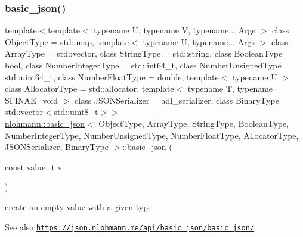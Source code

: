 \subsubsection{\texorpdfstring{basic\+\_\+json()}{basic\_json()}\hspace{0.1cm}{\footnotesize\ttfamily [1/9]}}
{\footnotesize\ttfamily template$<$template$<$ typename U, typename V, typename... Args $>$ class Object\+Type = std\+::map, template$<$ typename U, typename... Args $>$ class Array\+Type = std\+::vector, class String\+Type  = std\+::string, class Boolean\+Type  = bool, class Number\+Integer\+Type  = std\+::int64\+\_\+t, class Number\+Unsigned\+Type  = std\+::uint64\+\_\+t, class Number\+Float\+Type  = double, template$<$ typename U $>$ class Allocator\+Type = std\+::allocator, template$<$ typename T, typename S\+F\+I\+N\+A\+E=void $>$ class J\+S\+O\+N\+Serializer = adl\+\_\+serializer, class Binary\+Type  = std\+::vector$<$std\+::uint8\+\_\+t$>$$>$ \\
\hyperlink{classnlohmann_1_1basic__json}{nlohmann\+::basic\+\_\+json}$<$ Object\+Type, Array\+Type, String\+Type, Boolean\+Type, Number\+Integer\+Type, Number\+Unsigned\+Type, Number\+Float\+Type, Allocator\+Type, J\+S\+O\+N\+Serializer, Binary\+Type $>$\+::\hyperlink{classnlohmann_1_1basic__json}{basic\+\_\+json} (\begin{DoxyParamCaption}\item[{const \hyperlink{namespacenlohmann_1_1detail_a1ed8fc6239da25abcaf681d30ace4985}{value\+\_\+t}}]{v }\end{DoxyParamCaption})\hspace{0.3cm}{\ttfamily [inline]}}



create an empty value with a given type 

\begin{DoxySeeAlso}{See also}
\href{https://json.nlohmann.me/api/basic_json/basic_json/}{\tt https\+://json.\+nlohmann.\+me/api/basic\+\_\+json/basic\+\_\+json/} 
\end{DoxySeeAlso}
\mbox{\label{classnlohmann_1_1basic__json_ace6fbaf6c64f60b61922b5c9d3e61aa6}} 
